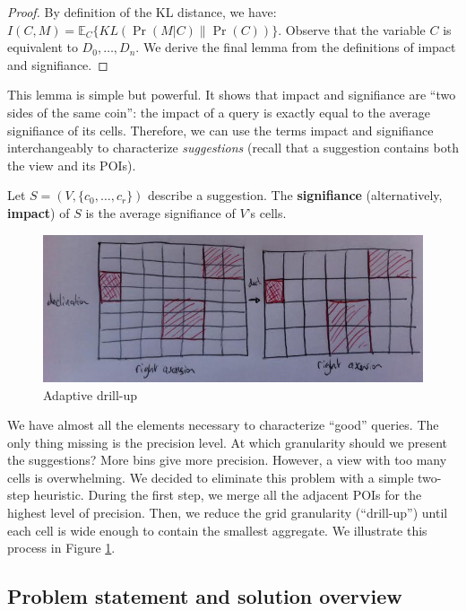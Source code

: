\begin{proof}
By definition of the KL distance, we have: $I(C,M) = \mathbb{E}_C \{ KL( \Pr(M
| C) \| \Pr(C) ) \}$. Observe that the variable $C$ is equivalent to $D_0,
\ldots , D_n$. We derive the final lemma from the definitions of impact and signifiance.
\end{proof}

This lemma is simple but powerful. It shows that impact and signifiance are
``two sides of the same coin'': the impact of a query is exactly equal to the
average signifiance of its cells.  Therefore, we can use the terms impact and
signifiance interchangeably to characterize \emph{suggestions} (recall that a
suggestion contains both the view and its POIs).

\begin{definition}
Let $S=(V, \{c_0, \ldots, c_r\})$ describe a suggestion. The
\textbf{signifiance} (alternatively, \textbf{impact}) of $S$ is the average
signifiance of $V$'s cells.
\end{definition}

\begin{figure}[t!]
\centering
\includegraphics[width=\columnwidth]{images/precision}
\caption{Adaptive drill-up}
\label{precision}
\end{figure}

We have almost all the elements necessary to characterize ``good'' queries.
The only thing missing is the precision level. At which granularity should we
present the suggestions? More bins give more precision. However, a view with
too many cells is overwhelming. We decided to eliminate this problem with a
simple two-step heuristic.  During the first step, we merge all the adjacent
POIs for the highest level of precision. Then, we reduce the grid granularity
(``drill-up'') until each cell is wide enough to contain the smallest
aggregate. We illustrate this process in Figure \ref{precision}.


\subsection{Problem statement and solution overview}

